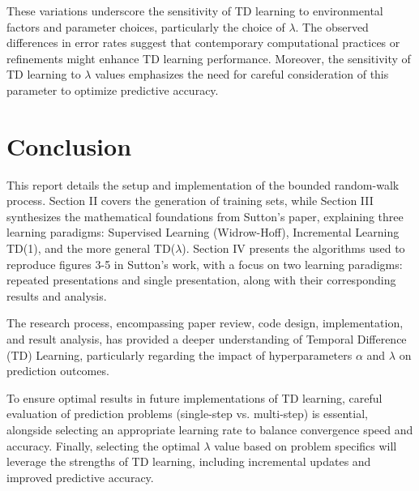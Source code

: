\documentclass[lettersize,journal]{IEEEtran}
\begin{document}
These variations underscore the sensitivity of TD learning to environmental factors and parameter choices, particularly the choice of $\lambda$. The observed differences in error rates suggest that contemporary computational practices or refinements might enhance TD learning performance. Moreover, the sensitivity of TD learning to $\lambda$ values emphasizes the need for careful consideration of this parameter to optimize predictive accuracy.

\section{Conclusion}

This report details the setup and implementation of the bounded random-walk process. Section II covers the generation of training sets, while Section III synthesizes the mathematical foundations from Sutton’s paper, explaining three learning paradigms: Supervised Learning (Widrow-Hoff), Incremental Learning TD(1), and the more general TD($\lambda$). Section IV presents the algorithms used to reproduce figures 3-5 in Sutton’s work, with a focus on two learning paradigms: repeated presentations and single presentation, along with their corresponding results and analysis.

The research process, encompassing paper review, code design, implementation, and result analysis, has provided a deeper understanding of Temporal Difference (TD) Learning, particularly regarding the impact of hyperparameters $\alpha$ and $\lambda$ on prediction outcomes. 

To ensure optimal results in future implementations of TD learning, careful evaluation of prediction problems (single-step vs. multi-step) is essential, alongside selecting an appropriate learning rate to balance convergence speed and accuracy. Finally, selecting the optimal $\lambda$ value based on problem specifics will leverage the strengths of TD learning, including incremental updates and improved predictive accuracy.


% 
% 
% 




\end{document}
